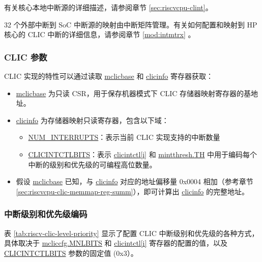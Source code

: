 \documentclass[main\_\_CN.tex]{subfiles}
\begin{document}
有关核心本地中断源的详细描述，请参阅章节 \ref{sec:riscvcpu-clint}。

32 个外部中断到 SoC 中断源的映射由中断矩阵管理。有关如何配置和映射到 HP 核心的 CLIC 中断的详细信息，请参阅章节 \ref{mod:intmtrx} \textit{}。

\hypertarget{riscvcpu-clic-params}{}
\subsubsection{CLIC 参数}
\label{sec:riscvcpu-clic-params}

CLIC 实现的特性可以通过读取 \hyperref[regdesc:MCLICBASE_REG]{mclicbase} 和 \hyperref[regdesc:CLICINFO_REG]{clicinfo} 寄存器获取：

\begin{itemize}
    \item \hyperref[regdesc:MCLICBASE_REG]{mclicbase} 为只读 CSR，用于保存机器模式下 CLIC 存储器映射寄存器的基地址。
    \item \hyperref[regdesc:CLICINFO_REG]{clicinfo} 为存储器映射只读寄存器，包含以下域：
    \begin{itemize}
        \item \hyperref[fielddesc:CLICINFO_NUM_INTERRUPTS]{NUM\_INTERRUPTS}：表示当前 CLIC 实现支持的中断数量
        \item \hyperref[fielddesc:CLICINFO_CLICINTCTLBITS]{CLICINTCTLBITS}：表示 \hyperref[regdesc:MCLICINTCTL_REG_i]{clicintctl[i]} 和 \hyperref[fielddesc:MINTTHRESH_TH]{{mintthresh.TH}} 中用于编码每个中断的级别和优先级的可编程高位数量。
    \end{itemize}
    \item 假设 \hyperref[fielddesc:MCLICBASE]{mclicbase} 已知，与 \hyperref[regdesc:CLICINFO_REG]{clicinfo} 对应的地址偏移量 0x0004 相加（参考章节 \ref{sec:riscvcpu-clic-memmap-reg-summ}），即可计算出 \hyperref[regdesc:CLICINFO_REG]{clicinfo} 的完整地址。
\end{itemize}


\hypertarget{riscvcpu-clic-int-level-prio}{}
 \subsubsection{中断级别和优先级编码}
\label{sec:riscvcpu-clic-int-level-prio}

表 \ref{tab:riscv-clic-level-priority} 显示了配置 CLIC 中断级别和优先级的各种方式，具体取决于 \hyperref[fielddesc:MCLICCFG_MNLBITS]{mcliccfg.MNLBITS} 和 \hyperref[regdesc:MCLICINTCTL_REG_i]{clicintctl[i]} 寄存器的配置的值，以及 \hyperref[fielddesc:CLICINFO_CLICINTCTLBITS]{CLICINTCTLBITS} 参数的固定值 (0x3）。
\end{document}
